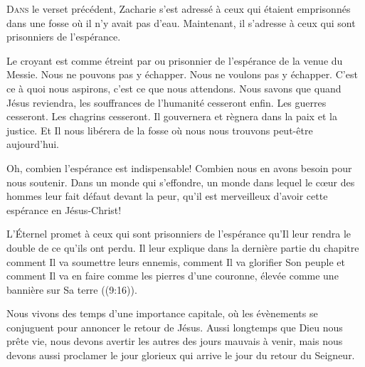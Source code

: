 \jrnlmonth





\lettrine{D}{ans} le verset précédent, Zacharie s'est adressé à ceux
 qui étaient emprisonnés dans une fosse où il n'y avait pas d'eau.
 Maintenant, il s'adresse à ceux qui sont prisonniers de l'espérance. 

Le croyant est comme \Og étreint par \Fg{} ou \Og prisonnier de \Fg{}
 l'espérance de la venue du Messie. Nous ne pouvons pas y échapper.
 Nous ne voulons pas y échapper. C'est ce à quoi nous aspirons,
 c'est ce que nous attendons. Nous savons que quand Jésus reviendra,
 les souffrances de l'humanité cesseront enfin. Les guerres cesseront.
 Les chagrins cesseront. Il gouvernera et règnera dans la paix et la justice.
 Et Il nous libérera de la fosse où nous nous trouvons peut-être aujourd'hui. 


Oh, combien l'espérance est indispensable! Combien nous en avons besoin
 pour nous soutenir. Dans un monde qui s'effondre, un monde dans lequel
 le c\oe{}ur des hommes leur fait défaut devant la peur,
 qu'il est merveilleux d'avoir cette espérance en Jésus-Christ! 

L'Éternel promet à ceux qui sont prisonniers de l'espérance qu'Il leur rendra
 le double de ce qu'ils ont perdu. Il leur explique dans la dernière partie
 du chapitre comment Il va soumettre leurs ennemis, comment Il va glorifier
 Son peuple et comment Il va en faire comme les pierres d'une couronne,
 \Og élevée comme une bannière sur Sa terre \Fg{} ((9:16)). 

Nous vivons des temps d'une importance capitale, où les évènements
 se conjuguent pour annoncer le retour de Jésus. Aussi longtemps que Dieu
 nous prête vie, nous devons avertir les autres des jours mauvais à venir,
 mais nous devons aussi proclamer le jour glorieux qui arrive
 \ocadr le jour du retour du Seigneur. 

